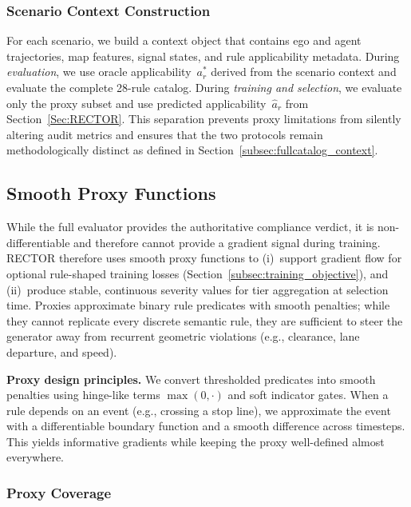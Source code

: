 \subsubsection{Scenario Context Construction}

For each scenario, we build a context object that contains ego and agent trajectories, map features, signal states, and rule applicability metadata. During \emph{evaluation}, we use oracle applicability~$a_r^*$ derived from the scenario context and evaluate the complete 28-rule catalog.  During \emph{training and selection}, we evaluate only the proxy subset and use predicted applicability~$\hat{a}_r$ from Section~\ref{Sec:RECTOR}.  This separation prevents proxy limitations from silently altering audit metrics and ensures that the two protocols remain methodologically distinct as defined in Section~\ref{subsec:fullcatalog_context}.

\subsection{Smooth Proxy Functions}
\label{subsec:proxy_functions}

While the full evaluator provides the authoritative compliance verdict, it is non-differentiable and therefore cannot provide a gradient signal during training.  RECTOR therefore uses smooth proxy functions to (i)~support gradient flow for optional rule-shaped training losses (Section~\ref{subsec:training_objective}), and (ii)~produce stable, continuous severity values for tier aggregation at selection time.  Proxies approximate binary rule predicates with smooth penalties; while they cannot replicate every discrete semantic rule, they are sufficient to steer the generator away from recurrent geometric violations (e.g., clearance, lane departure, and speed).

\textbf{Proxy design principles.}  We convert thresholded predicates into smooth penalties using hinge-like terms $\max(0,\cdot)$ and soft indicator gates.  When a rule depends on an event (e.g., crossing a stop line), we approximate the event with a differentiable boundary function and a smooth difference across timesteps.  This yields informative gradients while keeping the proxy well-defined almost everywhere.

\subsubsection{Proxy Coverage}

